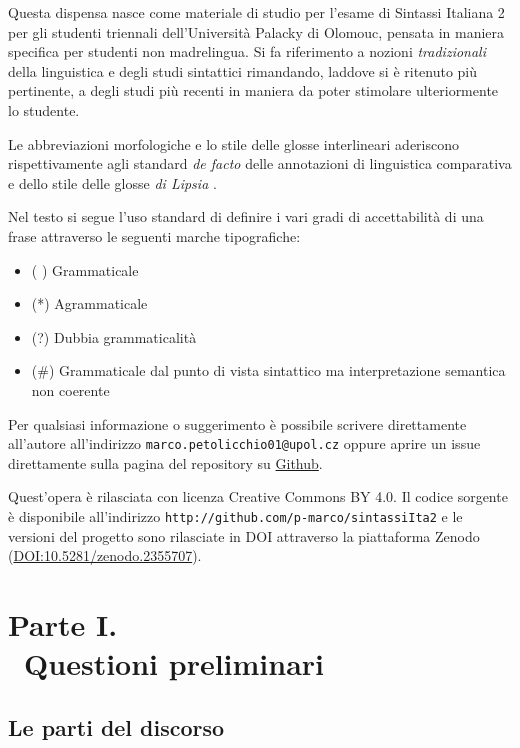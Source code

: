 \documentclass[
  a4paper,
  twoside,
  11pt,
  chapterprefix=false,
  bibliography=totocnumbered,
  listof=flat]{scrbook}
\providecommand{\tightlist}{%
  \setlength{\itemsep}{0pt}\setlength{\parskip}{0pt}}
\begin{document}
Questa dispensa nasce come materiale di studio per l'esame di Sintassi Italiana 2 per gli studenti triennali dell'Università Palacky di Olomouc, pensata in maniera specifica per studenti non madrelingua. Si fa riferimento a nozioni \emph{tradizionali} della linguistica e degli studi sintattici rimandando, laddove si è ritenuto più pertinente, a degli studi più recenti in maniera da poter stimolare ulteriormente lo studente.

Le abbreviazioni morfologiche e lo stile delle glosse interlineari aderiscono rispettivamente agli standard \emph{de facto} delle annotazioni di linguistica comparativa \citep[\href{http://www.oxfordhandbooks.com/view/10.1093/oxfordhb/9780199549368.001.0001/oxfordhb-9780199549368}{consultabile online}]{boeckxListOfAbbreviations} e dello stile delle glosse \emph{di Lipsia} \citep{leipzigGlossingRules}.

Nel testo si segue l'uso standard di definire i vari gradi di accettabilità di una frase attraverso le seguenti marche tipografiche:

\begin{itemize}
\tightlist
\item
  ( ) Grammaticale
\item
  (*) Agrammaticale
\item
  (?) Dubbia grammaticalità
\item
  (\#) Grammaticale dal punto di vista sintattico ma interpretazione semantica non coerente
\end{itemize}

Per qualsiasi informazione o suggerimento è possibile scrivere direttamente all'autore all'indirizzo \texttt{marco.petolicchio01@upol.cz} oppure aprire un issue direttamente sulla pagina del repository su \href{http://github.com/p-marco/sintassiIta2}{Github}.

Quest'opera è rilasciata con licenza Creative Commons BY 4.0. Il codice sorgente è disponibile all'indirizzo \texttt{http://github.com/p-marco/sintassiIta2} e le versioni del progetto sono rilasciate in DOI attraverso la piattaforma Zenodo (\url{DOI:10.5281/zenodo.2355707}).

\mainmatter

\part*{Parte I. \\\ Questioni preliminari}

\hypertarget{le-parti-del-discorso}{%
\chapter{Le parti del discorso}\label{le-parti-del-discorso}}
\end{document}
